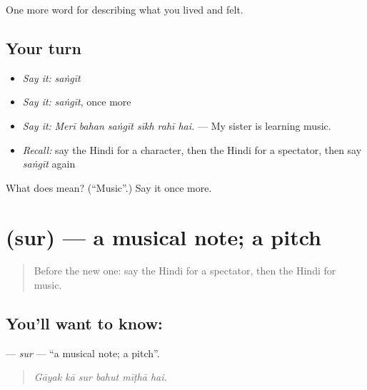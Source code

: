 \begin{grammarlens}[title={What you've built}]
One more word for describing what you lived and felt.
\end{grammarlens}

\subsection*{Your turn}
\begin{itemize}
\raggedright
  \item \emph{Say it:} \emph{saṅgīt}
  \item \emph{Say it:} \emph{saṅgīt}, once more
  \item \emph{Say it:} \emph{Merī bahan saṅgīt sīkh rahī hai.} — My sister is learning music.
  \item \emph{Recall:} say the Hindi for a character, then the Hindi for a spectator, then say \emph{saṅgīt} again
\end{itemize}

\begin{tcolorbox}[breakable,colback=teal!4,colframe=teal!35!black,title={Before you move on}]
What does  mean? (\textquotedblleft{}Music\textquotedblright{}.) Say it once more.
\end{tcolorbox}
\section[\texorpdfstring{\hi{सुर} (sur)}{सुर (sur)}]{ (sur) — a musical note; a pitch}

\label{lesson:HI-C530-sur}



\begin{quote}
Before the new one: say the Hindi for a spectator, then the Hindi for music.
\end{quote}

\subsection*{You'll want to know: }
\textbf{} — \emph{sur} — \textquotedblleft{}a musical note; a pitch\textquotedblright{}.

\begin{quote}
     
\end{quote}

\begin{quote}
\emph{Gāyak kā sur bahut mīṭhā hai.}
\end{quote}

